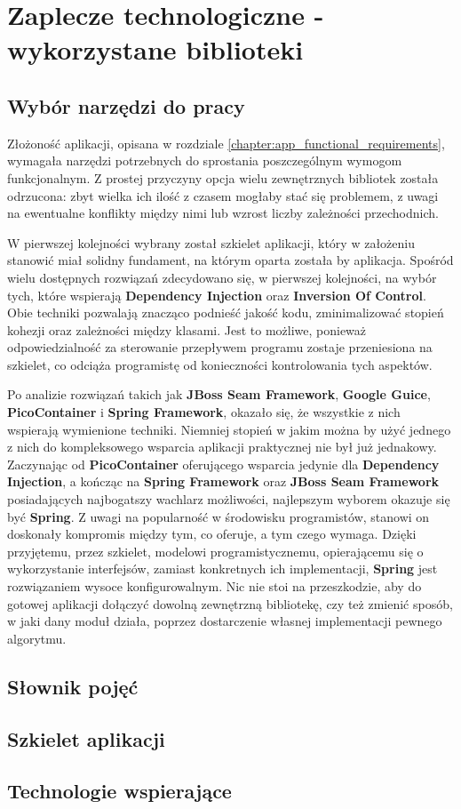\chapter{Zaplecze technologiczne - wykorzystane biblioteki}
\label{chapter:libs}

\section{Wybór narzędzi do pracy}
	Złożoność aplikacji, opisana w rozdziale \ref{chapter:app_functional_requirements}, wymagała narzędzi potrzebnych do sprostania poszczególnym wymogom funkcjonalnym. Z prostej przyczyny opcja wielu zewnętrznych bibliotek została odrzucona: zbyt wielka ich ilość z czasem mogłaby stać się problemem, z uwagi na ewentualne konflikty między nimi lub wzrost liczby zależności przechodnich. 
	
	W pierwszej kolejności wybrany został szkielet aplikacji, który w założeniu stanowić miał solidny fundament, na którym oparta została by aplikacja. Spośród wielu dostępnych rozwiązań zdecydowano się, w pierwszej kolejności, na wybór tych, które wspierają \textbf{Dependency Injection} oraz \textbf{Inversion Of Control}. Obie techniki pozwalają znacząco podnieść jakość kodu, zminimalizować stopień kohezji oraz zależności między klasami. Jest to możliwe, ponieważ odpowiedzialność za sterowanie przepływem programu zostaje przeniesiona na szkielet, co odciąża programistę od konieczności kontrolowania tych aspektów. 
	
	Po analizie rozwiązań takich jak \textbf{JBoss Seam Framework}, \textbf{Google Guice}, \textbf{PicoContainer} i \textbf{Spring Framework}, okazało się, że wszystkie z nich wspierają wymienione techniki. Niemniej stopień w jakim można by użyć jednego z nich do kompleksowego wsparcia aplikacji praktycznej nie był już jednakowy. Zaczynając od \textbf{PicoContainer} oferującego wsparcia jedynie dla \textbf{Dependency Injection}, a kończąc na \textbf{Spring Framework} oraz \textbf{JBoss Seam Framework} posiadających najbogatszy wachlarz możliwości, najlepszym wyborem okazuje się być \textbf{Spring}. Z uwagi na popularność w środowisku programistów, stanowi on doskonały kompromis między tym, co oferuje, a tym czego wymaga. Dzięki przyjętemu, przez szkielet, modelowi programistycznemu, opierającemu się o wykorzystanie interfejsów, zamiast konkretnych ich implementacji, \textbf{Spring} jest rozwiązaniem wysoce konfigurowalnym. Nic nie stoi na przeszkodzie, aby do gotowej aplikacji dołączyć dowolną zewnętrzną bibliotekę, czy też zmienić sposób, w jaki dany moduł działa, poprzez dostarczenie własnej implementacji pewnego algorytmu. 
	
\clearpage
\section{Słownik pojęć} 			
\section{Szkielet aplikacji}		
\section{Technologie wspierające}	
